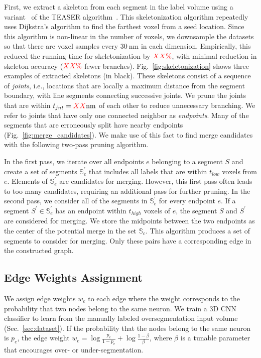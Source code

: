 First, we extract a skeleton from each segment in the label volume using a variant~\cite{zhao2014automatic} of the TEASER algorithm~\cite{sato2000teasar}. 
This skeletonization algorithm repeatedly uses Dijkstra's algorithm to find the farthest voxel from a seed location. 
Since this algorithm is non-linear in the number of voxels, we downsample the datasets so that there are voxel samples every $\SI{30}{\nano\meter}$ in each dimension.
Empirically, this reduced the running time for skeletonization by $\textcolor{red}{XX\%}$, with minimal reduction in skeleton accuracy ($\textcolor{red}{XX\%}$ fewer branches). 
Fig.~\ref{fig:skeletonization} shows three examples of extracted skeletons (in black). 
These skeletons consist of a sequence of \textit{joints}, i.e., locations that are locally a maximum distance from the segment boundary, with line segments connecting successive joints. 
We prune the joints that are within $t_{jnt} = \textcolor{red}{XX}\SI{}{\nano\meter}$ of each other to reduce unnecessary branching. 
We refer to joints that have only one connected neighbor as \textit{endpoints}. 
Many of the segments that are erroneously split have nearby endpoints  (Fig.~\ref{fig:merge_candidates}). 
We make use of this fact to find merge candidates with the following two-pass pruning algorithm.

In the first pass, we iterate over all endpoints $e$ belonging to a segment $S$ and create a set of segments $\mathbb{S}_e^\prime$ that includes all labels that are within $t_{low}$ voxels from $e$.
Elements of $\mathbb{S}_e^\prime$ are candidates for merging. 
However, this first pass often leads to too many candidates, requiring an additional pass for further pruning. 
In the second pass, we consider all of the segments in $\mathbb{S}_e^\prime$ for every endpoint $e$. 
If a segment $S^\prime \in \mathbb{S}_e^\prime$ has an endpoint within $t_{high}$ voxels of $e$, the segment $S$ and $S^\prime$ are considered for merging. 
We store the midpoints between the two endpoints as the center of the potential merge in the set $\mathbb{S}_c$. 
This algorithm produces a set of segments to consider for merging. Only these pairs have a corresponding edge in the constructed graph.

\subsection{Edge Weights Assignment}
We assign edge weights $w_e$ to each edge where the weight corresponds to the probability that two nodes belong to the same neuron.
We train a 3D CNN classifier to learn from the manually labeled oversegmentation input volume (Sec.~\ref{sec:dataset}).
If the probability that the nodes belong to the same neuron is $p_e$, the edge weight $w_e = \log{\frac{p_e}{1 - p_e}} + \log{\frac{1 - \beta}{\beta}}$, where $\beta$ is a tunable parameter that encourages over- or under-segmentation.


